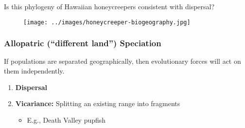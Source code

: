 \begin{frame}[t]
    \begin{adjustwidth}{-1.5em}{-1.5em}
    {\small Is this phylogeny of Hawaiian honeycreepers consistent with dispersal?}
        \begin{figure}
            \begin{center}
                \texttt{[image: ../images/honeycreeper-biogeography.jpg]}
                \caption{}
            \end{center}
        \end{figure}
    \end{adjustwidth}
\end{frame}


\begin{frame}[t]
    \frametitle{Allopatric (``different land'') Speciation}
    \vspace{-4mm}
    \begin{adjustwidth}{-1.5em}{-1.5em}
        If populations are separated geographically, then evolutionary forces
        will act on them independently.
        \begin{enumerate}
            \item \textbf{Dispersal}
            \item \textbf{Vicariance:} Splitting an existing range into fragments
                \begin{itemize}
                    \item E.g., Death Valley pupfish
                \end{itemize}
        \end{enumerate}
    \end{adjustwidth}

\end{frame}


